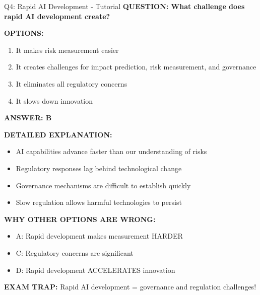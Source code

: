 \documentclass[8pt]{beamer}
\begin{document}
	\begin{frame}{Q4: Rapid AI Development - Tutorial}
		\fontsize{6.5}{7.5}\selectfont
		\textbf{QUESTION: What challenge does rapid AI development create?}
		
		\vspace{0.1cm}
		\textbf{OPTIONS:}
		\begin{enumerate}
			\item It makes risk measurement easier
			\item It creates challenges for impact prediction, risk measurement, and governance
			\item It eliminates all regulatory concerns
			\item It slows down innovation
		\end{enumerate}
		
		\vspace{0.1cm}
		\textcolor{myblue}{\textbf{ANSWER: B}}
		
		\vspace{0.1cm}
		\textbf{DETAILED EXPLANATION:}
		\begin{itemize}
			\item AI capabilities advance faster than our understanding of risks
			\item Regulatory responses lag behind technological change
			\item Governance mechanisms are difficult to establish quickly
			\item Slow regulation allows harmful technologies to persist
		\end{itemize}
		
		\vspace{0.1cm}
		\textcolor{myred}{\textbf{WHY OTHER OPTIONS ARE WRONG:}}
		\begin{itemize}
			\item \textcolor{myred}{A:} Rapid development makes measurement HARDER
			\item \textcolor{myred}{C:} Regulatory concerns are significant
			\item \textcolor{myred}{D:} Rapid development ACCELERATES innovation
		\end{itemize}
		
		\textcolor{myred}{\textbf{EXAM TRAP:}} Rapid AI development = \textcolor{myblue}{governance and regulation challenges}!
	\end{frame}
	
\end{document}
